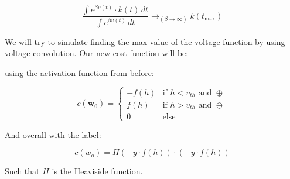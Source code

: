 \begin{equation}
    \frac
    { 
        \int e^{\beta v(t)} \cdot k(t) \, dt 
    } 
    {
        \int e^{\beta v(t)} \, dt 
    } 
    \rightarrow_{(\beta \rightarrow \infty)}  k(t_{\text{max}})
\end{equation}

We will try to simulate finding the max value of the voltage function by using voltage convolution. Our new cost function will be:

using the activation function from before:

\begin{equation}
    c(\mathbf{w}_0) = \begin{cases}
    -f(h) & \text{if } h < v_{th} \text{ and } \oplus \\
    f(h) & \text{if } h > v_{th} \text{ and } \ominus \\
    0 & \text{else}
    \end{cases}
\end{equation}

And overall with the label:

\begin{equation}
    c(w_o) = H(-y \cdot f(h)) \cdot (-y \cdot f(h))
\end{equation}

Such that $H$ is the Heaviside function.

